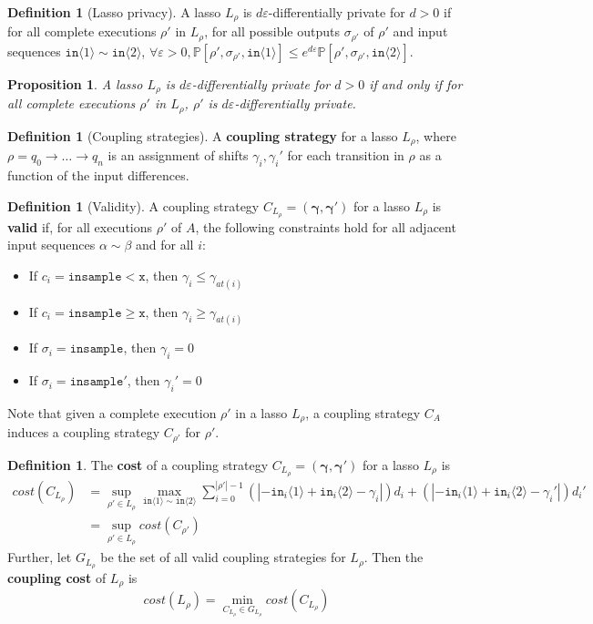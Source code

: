 \documentclass[12pt]{article}
\newcommand{\PP}{\mathbb{P}}
\newcommand{\gguard}[1][x]{\texttt{insample}\geq #1}
\newcommand{\lguard}[1][x]{\texttt{insample} < #1}
\newcommand{\brangle}[1]{\langle #1 \rangle}
\newtheorem{prop}[thm]{Proposition}
\theoremstyle{definition}
\newtheorem{defn}[thm]{Definition}
\begin{document}
\begin{defn}[Lasso privacy]
    A lasso $L_\rho$ is $d\varepsilon$-differentially private for $d>0$ if for all complete executions $\rho'$ in $L_\rho$, for all possible outputs $\sigma_{\rho'}$ of $\rho'$ and input sequences $\texttt{in}\brangle{1}\sim \texttt{in}\brangle{2}$, $\forall \varepsilon>0, \PP[\rho', \sigma_{\rho'}, \texttt{in}\brangle{1}]\leq e^{d\varepsilon}\PP[\rho', \sigma_{\rho'}, \texttt{in}\brangle{2}]$.
\end{defn}

\begin{prop}
    A lasso $L_\rho$ is $d\varepsilon$-differentially private for $d>0$ if and only if for all complete executions $\rho'$ in $L_\rho$, $\rho'$ is $d\varepsilon$-differentially private. 
\end{prop}

\begin{defn}[Coupling strategies]
    A \textbf{coupling strategy} for a lasso $L_\rho$, where $\rho=q_0\to\ldots \to q_n$ is an assignment of shifts $\gamma_i, \gamma_i'$ for each transition in $\rho$ as a function of the input differences. 
\end{defn}

\begin{defn}[Validity]
    A coupling strategy $C_{L_\rho}=(\bm{\gamma}, \bm{\gamma}')$ for a lasso $L_\rho$ is \textbf{valid} if, for all executions $\rho'$ of $A$, the following constraints hold for all adjacent input sequences $\alpha\sim\beta$ and for all $i$:
    \begin{itemize}
        \item If $c_i = \lguard[\texttt{x}]$, then $\gamma_i\leq\gamma_{at(i)}$
        \item If $c_i = \gguard[\texttt{x}]$, then $\gamma_i\geq\gamma_{at(i)}$
        \item If $\sigma_i = \texttt{insample}$, then $\gamma_i=0$
        \item If $\sigma_i = \texttt{insample}'$, then $\gamma_i'=0$
    \end{itemize}
\end{defn}

Note that given a complete execution $\rho'$ in a lasso $L_\rho$, a coupling strategy $C_A$ induces a coupling strategy $C_{\rho'}$ for $\rho'$.

\begin{defn}
    The \textbf{cost} of a coupling strategy $C_{L_\rho} = (\bm{\gamma}, \bm{\gamma}')$ for a lasso $L_\rho$ is \begin{align*}
    cost(C_{L_\rho}) &= \sup_{\rho'\in L_{\rho}}\max_{\texttt{in}\brangle{1}\sim \texttt{in}\brangle{2}} \sum_{i=0}^{|\rho'|-1}(|-\texttt{in}_i\brangle{1}+\texttt{in}_i\brangle{2}-\gamma_i|)d_i+(|-\texttt{in}_i\brangle{1}+\texttt{in}_i\brangle{2}-\gamma_i'|)d_i'\\
    &=\sup_{\rho'\in L_\rho}cost(C_{\rho'})
\end{align*}
    Further, let $G_{L_\rho}$ be the set of all valid coupling strategies for $L_\rho$. Then the \textbf{coupling cost} of $L_\rho$ is \[
        cost(L_\rho) = \min_{C_{L_\rho}\in G_{L_\rho}}cost(C_{L_\rho})
    \]
\end{defn}
\end{document}
